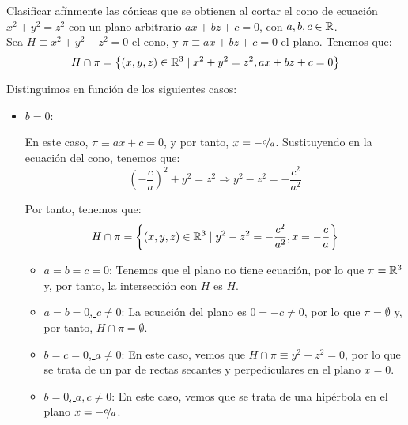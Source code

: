 \documentclass[12pt]{article}
\begin{document}
    \begin{ejercicio}[3 puntos]
        Clasificar afínmente las cónicas que se obtienen al cortar el cono de ecuación
        $x^2+y^2=z^2$ con un plano arbitrario $ax+bz+c=0$, con $a,b,c\in \mathbb{R}$.\\

        Sea $H\equiv x^2+y^2-z^2=0$ el cono, y $\pi\equiv ax+bz+c=0$ el plano. Tenemos que:
        \begin{equation*}
            H \cap \pi = \left\{(x,y,z)\in \mathbb{R}^3\mid x^2+y^2=z^2, ax+bz+c=0\right\}
        \end{equation*}

        Distinguimos en función de los siguientes casos:
        \begin{itemize}
            \item \ul{$b=0$}:
            
            En este caso, $\pi\equiv ax+c=0$, y por tanto, $x=-\nicefrac{c}{a}$.
            Sustituyendo en la ecuación del cono, tenemos que:
            \begin{equation*}
                \left(-\frac{c}{a}\right)^2+y^2=z^2
                \Longrightarrow
                y^2-z^2 = -\frac{c^2}{a^2}
            \end{equation*}

            Por tanto, tenemos que:
            \begin{equation*}
                H\cap \pi = \left\{(x,y,z)\in \mathbb{R}^3\mid y^2-z^2=-\frac{c^2}{a^2}, x=-\frac{c}{a}\right\}
            \end{equation*}

            \begin{itemize}
                \item \ul{$a = b=c=0$}:
                Tenemos que el plano no tiene ecuación, por lo que $\pi=\mathbb{R}^3$ y, por tanto,
                la intersección con $H$ es $H$.

                \item \ul{$a=b=0$, $c\neq 0$}:
                La ecuación del plano es $0=-c \neq 0$, por lo que $\pi=\emptyset$ y, por tanto,
                $H\cap \pi=\emptyset$.

                \item \ul{$b=c=0$, $a\neq 0$}:
                En este caso, vemos que $H\cap \pi\equiv y^2-z^2=0$, por lo que
                se trata de un par de rectas secantes y perpediculares en el plano $x=0$.

                \item \ul{$b=0$, $a,c\neq 0$}:
                En este caso, vemos que se trata de una hipérbola en el plano $x=-\nicefrac{c}{a}$.
            \end{itemize}



\end{itemize}
\end{ejercicio}
\end{document}
